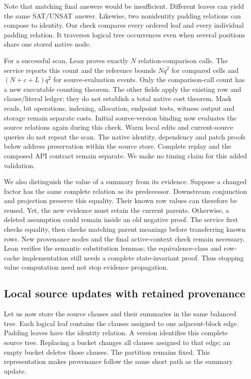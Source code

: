 \documentclass[11pt,a4paper]{article}
\numberwithin{equation}{section}
\theoremstyle{plain}
\theoremstyle{definition}
\theoremstyle{remark}
\begin{document}
Note that matching final answers would be insufficient. Different leaves can yield the same SAT/UNSAT answer. Likewise, two nonidentity padding relations can compose to identity. Our check compares every ordered leaf and every individual padding relation. It traverses logical tree occurrences even when several positions share one stored native node.

For a successful scan, Lean proves exactly $N$ relation-comparison calls. The service reports this count and the reference bounds $Nq^2$ for compared cells and $(N+c+L)q^2$ for source-evaluation events. Only the comparison-call count has a new executable counting theorem. The other fields apply the existing row and clause/literal ledger; they do not establish a total native cost theorem. Mask reads, bit operations, indexing, allocation, endpoint tests, witness output and storage remain separate costs. Initial source-version binding now evaluates the source relations again during this check. Warm local edits and current-source queries do not repeat the scan. The native identity, dependency and patch proofs below address preservation within the source store. Complete replay and the composed API contract remain separate. We make no timing claim for this added validation.

We also distinguish the value of a summary from its evidence. Suppose a changed factor has the same complete relation as its predecessor. Downstream conjunction and projection preserve this equality. Their known row values can therefore be reused. Yet, the new evidence must retain the current parents. Otherwise, a deleted assumption could remain inside an old negative proof. The service first checks equality, then checks matching parent meanings before transferring known rows. New provenance nodes and the final active-context check remain necessary. Lean verifies the semantic substitution lemmas; the equivalence-class and row-cache implementation still needs a complete state-invariant proof. Thus stopping value computation need not stop evidence propagation.

\subsection{Local source updates with retained provenance}
\label{sec:source-updates}

Let us now store the source clauses and their summaries in the same balanced tree. Each logical leaf contains the clauses assigned to one adjacent-block edge. Padding leaves have the identity relation. A version identifies this complete source tree. Replacing a bucket changes all clauses assigned to that edge; an empty bucket deletes those clauses. The partition remains fixed. This representation makes provenance follow the same short path as the summary update.
\end{document}

